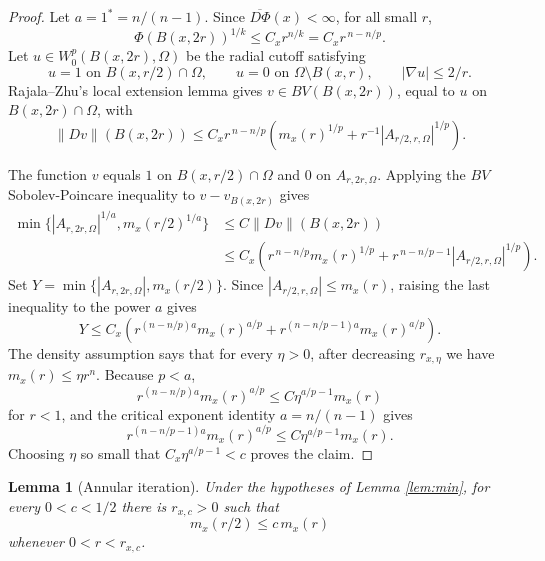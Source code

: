 \documentclass[11pt]{article}
\newtheorem{lemma}{Lemma}
\newcommand{\Om}{\Omega}
\newcommand{\onecrit}{1^\ast}
\begin{document}
\begin{proof}
Let \(a=\onecrit=n/(n-1)\). Since \(\overline{D\Phi}(x)<\infty\), for all
small \(r\),
\[
  \Phi(B(x,2r))^{1/k}\le C_x r^{n/k}
      =C_x r^{\,n-n/p}.
\]
Let \(u\in W^p_0(B(x,2r),\Om)\) be the radial cutoff satisfying
\[
 u=1\text{ on }B(x,r/2)\cap\Om,\qquad
 u=0\text{ on }\Om\setminus B(x,r),\qquad
 |\nabla u|\le 2/r.
\]
Rajala--Zhu's local extension lemma gives \(v\in BV(B(x,2r))\), equal to \(u\)
on \(B(x,2r)\cap\Om\), with
\[
  \|Dv\|(B(x,2r))
      \le C_x r^{\,n-n/p}
          \left(m_x(r)^{1/p}
          +r^{-1}|A_{r/2,r,\Om}|^{1/p}\right).
\]

The function \(v\) equals \(1\) on \(B(x,r/2)\cap\Om\) and \(0\) on
\(A_{r,2r,\Om}\). Applying the \(BV\) Sobolev-Poincare inequality to
\(v-v_{B(x,2r)}\) gives
\[
\begin{aligned}
  \min\{|A_{r,2r,\Om}|^{1/a},m_x(r/2)^{1/a}\}
   &\le C\|Dv\|(B(x,2r))  \\
   &\le C_x\left(
        r^{\,n-n/p}m_x(r)^{1/p}
       +r^{\,n-n/p-1}|A_{r/2,r,\Om}|^{1/p}\right).
\end{aligned}
\]
Set \(Y=\min\{|A_{r,2r,\Om}|,m_x(r/2)\}\). Since
\(|A_{r/2,r,\Om}|\le m_x(r)\), raising the last inequality to the power \(a\)
gives
\[
  Y\le C_x\left(
        r^{(n-n/p)a}m_x(r)^{a/p}
       +r^{(n-n/p-1)a}m_x(r)^{a/p}\right).
\]
The density assumption says that for every \(\eta>0\), after decreasing
\(r_{x,\eta}\) we have \(m_x(r)\le\eta r^n\). Because \(p<a\),
\[
  r^{(n-n/p)a}m_x(r)^{a/p}
      \le C\eta^{a/p-1}m_x(r)
\]
for \(r<1\), and the critical exponent identity \(a=n/(n-1)\) gives
\[
  r^{(n-n/p-1)a}m_x(r)^{a/p}
      \le C\eta^{a/p-1}m_x(r).
\]
Choosing \(\eta\) so small that \(C_x\eta^{a/p-1}<c\) proves the claim.
\end{proof}

\begin{lemma}[Annular iteration]\label{lem:upper}
Under the hypotheses of Lemma \ref{lem:min}, for every \(0<c<1/2\) there is
\(r_{x,c}>0\) such that
\[
  m_x(r/2)\le c\,m_x(r)
\]
whenever \(0<r<r_{x,c}\).
\end{lemma}
\end{document}
